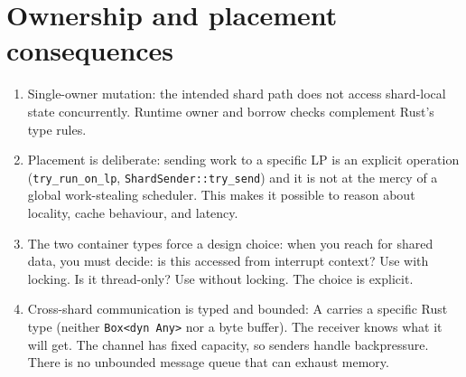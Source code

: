 \section{Ownership and placement consequences}

\begin{enumerate}
    \item Single-owner mutation: the intended shard path does not access
        shard-local state concurrently. Runtime owner and borrow checks complement
        Rust's type rules.

    \item Placement is deliberate: sending work to a
        specific LP is an explicit operation (\texttt{try\_run\_on\_lp},
        \texttt{ShardSender::try\_send}) and it is not at the mercy of a global
        work-stealing scheduler. This makes it possible to reason about locality,
        cache behaviour, and latency.

    \item The two container types force a design choice: when you reach
        for shared data, you must decide: is this accessed from interrupt context?
        Use  with locking. Is it thread-only? Use
         without locking. The choice is explicit.

    \item Cross-shard communication is typed and bounded: A
         carries a specific Rust type (neither
        \texttt{Box<dyn Any>} nor a byte buffer). The receiver knows what it will
        get. The channel has fixed capacity, so senders handle backpressure. There
        is no unbounded message queue that can exhaust memory.
\end{enumerate}

\endinput
